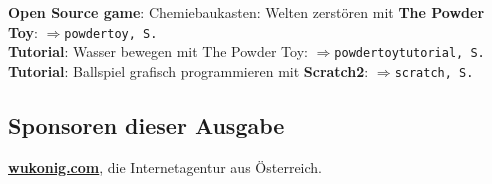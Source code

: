 \textbf{Open Source game}: Chemiebaukasten: Welten zerstören mit \textbf{The Powder Toy}: $\Rightarrow$\texttt{powdertoy, S. \pageref{powdertoy}}\\
\textbf{Tutorial}: Wasser bewegen mit The Powder Toy: $\Rightarrow$\texttt{powdertoytutorial, S. \pageref{powdertoytutorial}}\\
\textbf{Tutorial}: Ballspiel grafisch programmieren mit \textbf{Scratch2}: $\Rightarrow$\texttt{scratch, S. \pageref{scratch}}\\

\subsection*{Sponsoren dieser Ausgabe}
\href{http://wukuonig.com}{\textbf{wukonig.com}}, die Internetagentur aus Österreich.
